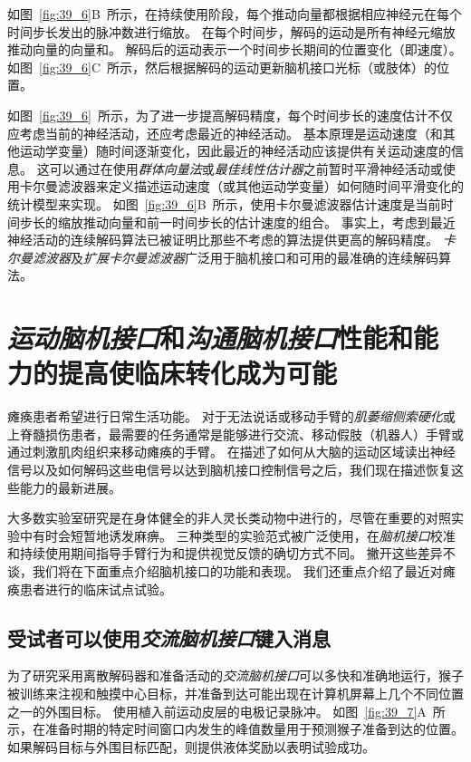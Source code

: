 如图~\ref{fig:39_6}B~所示，在持续使用阶段，每个推动向量都根据相应神经元在每个时间步长发出的脉冲数进行缩放。
在每个时间步，解码的运动是所有神经元缩放推动向量的向量和。
解码后的运动表示一个时间步长期间的位置变化（即速度）。
如图~\ref{fig:39_6}C~所示，然后根据解码的运动更新脑机接口光标（或肢体）的位置。


如图~\ref{fig:39_6}~所示，为了进一步提高解码精度，每个时间步长的速度估计不仅应考虑当前的神经活动，还应考虑最近的神经活动。
基本原理是运动速度（和其他运动学变量）随时间逐渐变化，因此最近的神经活动应该提供有关运动速度的信息。 
这可以通过在使用\textit{群体向量法}或\textit{最佳线性估计器}之前暂时平滑神经活动或使用卡尔曼滤波器来定义描述运动速度（或其他运动学变量）如何随时间平滑变化的统计模型来实现。
如图~\ref{fig:39_6}B~所示，使用卡尔曼滤波器估计速度是当前时间步长的缩放推动向量和前一时间步长的估计速度的组合。
事实上，考虑到最近神经活动的连续解码算法已被证明比那些不考虑的算法提供更高的解码精度。
\textit{卡尔曼滤波器}及\textit{扩展卡尔曼滤波器}广泛用于脑机接口和可用的最准确的连续解码算法。



\section{\textit{运动脑机接口}和\textit{沟通脑机接口}性能和能力的提高使临床转化成为可能}

瘫痪患者希望进行日常生活功能。
对于无法说话或移动手臂的\textit{肌萎缩侧索硬化}或上脊髓损伤患者，最需要的任务通常是能够进行交流、移动假肢（机器人）手臂或通过刺激肌肉组织来移动瘫痪的手臂。
在描述了如何从大脑的运动区域读出神经信号以及如何解码这些电信号以达到脑机接口控制信号之后，我们现在描述恢复这些能力的最新进展。


大多数实验室研究是在身体健全的非人灵长类动物中进行的，尽管在重要的对照实验中有时会短暂地诱发麻痹。
三种类型的实验范式被广泛使用，在\textit{脑机接口}校准和持续使用期间指导手臂行为和提供视觉反馈的确切方式不同。
撇开这些差异不谈，我们将在下面重点介绍脑机接口的功能和表现。
我们还重点介绍了最近对瘫痪患者进行的临床试点试验。



\subsection{受试者可以使用\textit{交流脑机接口}键入消息}

为了研究采用离散解码器和准备活动的\textit{交流脑机接口}可以多快和准确地运行，猴子被训练来注视和触摸中心目标，并准备到达可能出现在计算机屏幕上几个不同位置之一的外围目标。
使用植入前运动皮层的电极记录脉冲。
如图~\ref{fig:39_7}A~所示，在准备时期的特定时间窗口内发生的峰值数量用于预测猴子准备到达的位置。
如果解码目标与外围目标匹配，则提供液体奖励以表明试验成功。

